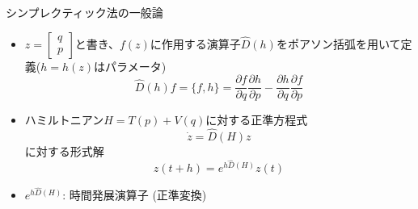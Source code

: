 \begin{frame}[t,fragile]{シンプレクティック法の一般論}
  \begin{itemize}
  \item $z=\begin{bmatrix} q \\ p \end{bmatrix}$と書き、$f(z)$に作用する演算子$\hat{D}(h)$をポアソン括弧を用いて定義($h=h(z)$はパラメータ)
    \[
    \hat{D}(h)f = \{ f, h \} = \frac{\partial f}{\partial q} \frac{\partial h}{\partial p} - \frac{\partial h}{\partial q} \frac{\partial f}{\partial p}
    \]
  \item ハミルトニアン$H=T(p)+V(q)$に対する正準方程式
    \[
    \dot{z} = \hat{D}(H) z
    \]
    に対する形式解
    \[
    z(t+h) = e^{h \hat{D}(H)} z(t)
    \]
  \item $e^{h \hat{D}(H)}$: 時間発展演算子 (正準変換)
  \end{itemize}
\end{frame}

